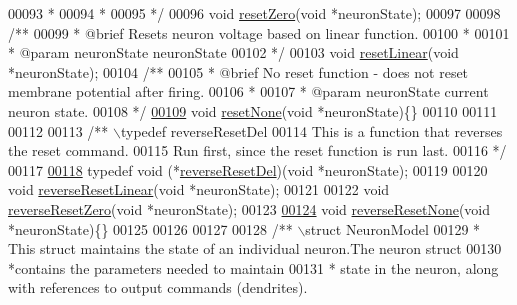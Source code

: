 \begin{DoxyCode}
00093 \textcolor{comment}{ *}
00094 \textcolor{comment}{ *}
00095 \textcolor{comment}{ */}
00096 \textcolor{keywordtype}{void} \hyperlink{neuron_8h_a7f8eaa35f03747c795a2b727b364537b}{resetZero}(\textcolor{keywordtype}{void} *neuronState);
00097 
00098 \textcolor{comment}{/**}
00099 \textcolor{comment}{ *  @brief  Resets neuron voltage based on linear function.}
00100 \textcolor{comment}{ *}
00101 \textcolor{comment}{ *  @param neuronState neuronState}
00102 \textcolor{comment}{ */}
00103 \textcolor{keywordtype}{void} \hyperlink{neuron_8h_a2e78d7d2b70bf7349c3854b3727dcc25}{resetLinear}(\textcolor{keywordtype}{void} *neuronState);
00104 \textcolor{comment}{/**}
00105 \textcolor{comment}{ *  @brief  No reset function - does not reset membrane potential after firing.}
00106 \textcolor{comment}{ *}
00107 \textcolor{comment}{ *  @param neuronState current neuron state.}
00108 \textcolor{comment}{ */}
\hypertarget{neuron_8h_source_l00109}{}\hyperlink{neuron_8h_a6e11be912b4860cd1978b2d8c49b9703}{00109} \textcolor{keywordtype}{void} \hyperlink{neuron_8h_a6e11be912b4860cd1978b2d8c49b9703}{resetNone}(\textcolor{keywordtype}{void} *neuronState)\{\}
00110 
00111 
00112 
00113 \textcolor{comment}{/** \(\backslash\)typedef reverseResetDel}
00114 \textcolor{comment}{ This is a function that reverses the reset command.}
00115 \textcolor{comment}{ Run first, since the reset function is run last.}
00116 \textcolor{comment}{ */}
00117 
\hypertarget{neuron_8h_source_l00118}{}\hyperlink{neuron_8h_aa939c0acc5b3367975f2f0cb7bc36d17}{00118} \textcolor{keyword}{typedef} \textcolor{keywordtype}{void} (*\hyperlink{neuron_8h_aa939c0acc5b3367975f2f0cb7bc36d17}{reverseResetDel})(\textcolor{keywordtype}{void} *neuronState);
00119 
00120 \textcolor{keywordtype}{void} \hyperlink{neuron_8h_a09e54832158e2f6abe898437979aae00}{reverseResetLinear}(\textcolor{keywordtype}{void} *neuronState);
00121 
00122 \textcolor{keywordtype}{void} \hyperlink{neuron_8h_ae53276ccdb759ba1ea09806cbf9fc940}{reverseResetZero}(\textcolor{keywordtype}{void} *neuronState);
00123 
\hypertarget{neuron_8h_source_l00124}{}\hyperlink{neuron_8h_a50b2475c0a8d745eb8f144b72d7eabdf}{00124} \textcolor{keywordtype}{void} \hyperlink{neuron_8h_a50b2475c0a8d745eb8f144b72d7eabdf}{reverseResetNone}(\textcolor{keywordtype}{void} *neuronState)\{\}
00125 
00126 
00127 
00128 \textcolor{comment}{/** \(\backslash\)struct NeuronModel}
00129 \textcolor{comment}{* This struct maintains the state of an individual neuron.The neuron struct}
00130 \textcolor{comment}{*contains the parameters needed to maintain}
00131 \textcolor{comment}{* state in the neuron, along with references to output commands (dendrites).}

\end{DoxyCode}
